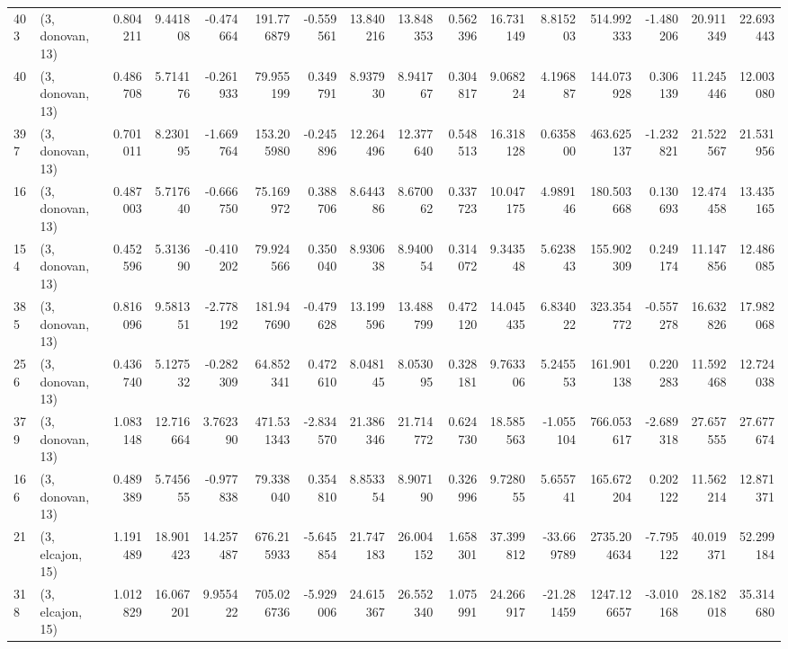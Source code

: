 \begin{tabular}{llrrrrrrrrrrrrrr}
403 &  (3, donovan, 13) &   0.804211 &   9.441808 &  -0.474664 &   191.776879 &  -0.559561 &  13.840216 &  13.848353 &  0.562396 &  16.731149 &   8.815203 &    514.992333 &   -1.480206 &   20.911349 &   22.693443 \\
40  &  (3, donovan, 13) &   0.486708 &   5.714176 &  -0.261933 &    79.955199 &   0.349791 &   8.937930 &   8.941767 &  0.304817 &   9.068224 &   4.196887 &    144.073928 &    0.306139 &   11.245446 &   12.003080 \\
397 &  (3, donovan, 13) &   0.701011 &   8.230195 &  -1.669764 &   153.205980 &  -0.245896 &  12.264496 &  12.377640 &  0.548513 &  16.318128 &   0.635800 &    463.625137 &   -1.232821 &   21.522567 &   21.531956 \\
16  &  (3, donovan, 13) &   0.487003 &   5.717640 &  -0.666750 &    75.169972 &   0.388706 &   8.644386 &   8.670062 &  0.337723 &  10.047175 &   4.989146 &    180.503668 &    0.130693 &   12.474458 &   13.435165 \\
154 &  (3, donovan, 13) &   0.452596 &   5.313690 &  -0.410202 &    79.924566 &   0.350040 &   8.930638 &   8.940054 &  0.314072 &   9.343548 &   5.623843 &    155.902309 &    0.249174 &   11.147856 &   12.486085 \\
385 &  (3, donovan, 13) &   0.816096 &   9.581351 &  -2.778192 &   181.947690 &  -0.479628 &  13.199596 &  13.488799 &  0.472120 &  14.045435 &   6.834022 &    323.354772 &   -0.557278 &   16.632826 &   17.982068 \\
256 &  (3, donovan, 13) &   0.436740 &   5.127532 &  -0.282309 &    64.852341 &   0.472610 &   8.048145 &   8.053095 &  0.328181 &   9.763306 &   5.245553 &    161.901138 &    0.220283 &   11.592468 &   12.724038 \\
379 &  (3, donovan, 13) &   1.083148 &  12.716664 &   3.762390 &   471.531343 &  -2.834570 &  21.386346 &  21.714772 &  0.624730 &  18.585563 &  -1.055104 &    766.053617 &   -2.689318 &   27.657555 &   27.677674 \\
166 &  (3, donovan, 13) &   0.489389 &   5.745655 &  -0.977838 &    79.338040 &   0.354810 &   8.853354 &   8.907190 &  0.326996 &   9.728055 &   5.655741 &    165.672204 &    0.202122 &   11.562214 &   12.871371 \\
21  &  (3, elcajon, 15) &   1.191489 &  18.901423 &  14.257487 &   676.215933 &  -5.645854 &  21.747183 &  26.004152 &  1.658301 &  37.399812 & -33.669789 &   2735.204634 &   -7.795122 &   40.019371 &   52.299184 \\
318 &  (3, elcajon, 15) &   1.012829 &  16.067201 &   9.955422 &   705.026736 &  -5.929006 &  24.615367 &  26.552340 &  1.075991 &  24.266917 & -21.281459 &   1247.126657 &   -3.010168 &   28.182018 &   35.314680 \\

\end{tabular}
